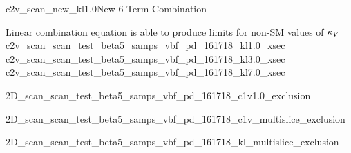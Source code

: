 {c2v_scan_new_kl1.0}{New 6 Term Combination}


{ Linear combination equation is able to produce limits for non-SM values of $\kappa_{V}$}
{c2v_scan_scan_test_beta5_samps_vbf_pd_161718_kl1.0_xsec}
{c2v_scan_scan_test_beta5_samps_vbf_pd_161718_kl3.0_xsec}
{c2v_scan_scan_test_beta5_samps_vbf_pd_161718_kl7.0_xsec}

{2D_scan_scan_test_beta5_samps_vbf_pd_161718_c1v1.0_exclusion}

{2D_scan_scan_test_beta5_samps_vbf_pd_161718_c1v_multislice_exclusion}

{2D_scan_scan_test_beta5_samps_vbf_pd_161718_kl_multislice_exclusion}
